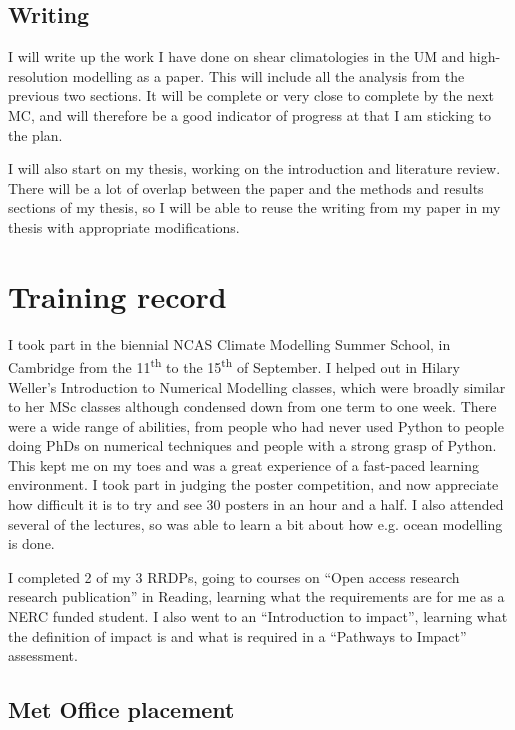 \documentclass[11pt,a4paper]{article}
\newcommand{\ts}{\textsuperscript}
\begin{document}
\subsection{Writing}
\label{sec:Writing}

I will write up the work I have done on shear climatologies in the UM and high-resolution modelling as a paper. This will include all the analysis from the previous two sections. It will be complete or very close to complete by the next MC, and will therefore be a good indicator of progress at that I am sticking to the plan.

I will also start on my thesis, working on the introduction and literature review. There will be a lot of overlap between the paper and the methods and results sections of my thesis, so I will be able to reuse the writing from my paper in my thesis with appropriate modifications.

\section{Training record}
\label{sec:Training record}

I took part in the biennial NCAS Climate Modelling Summer School, in Cambridge from the 11\ts{th} to the 15\ts{th} of September. I helped out in Hilary Weller's Introduction to Numerical Modelling classes, which were broadly similar to her MSc classes although condensed down from one term to one week. There were a wide range of abilities, from people who had never used Python to people doing PhDs on numerical techniques and people with a strong grasp of Python. This kept me on my toes and was a great experience of a fast-paced learning environment. I took part in judging the poster competition, and now appreciate how difficult it is to try and see 30 posters in an hour and a half. I also attended several of the lectures, so was able to learn a bit about how e.g. ocean modelling is done.

I completed 2 of my 3 RRDPs, going to courses on ``Open access research research publication'' in Reading, learning what the requirements are for me as a NERC funded student. I also went to an ``Introduction to impact'', learning what the definition of impact is and what is required in a ``Pathways to Impact'' assessment. 

\subsection{Met Office placement}
\label{sec:Met Office placement}
\end{document}
